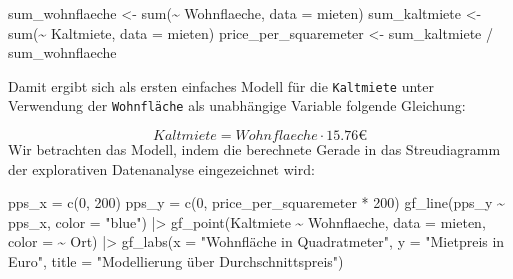 \documentclass[
  a4paper,
  DIV=11]{scrartcl}
\newenvironment{Shaded}{\begin{snugshade}}{\end{snugshade}}
\newcommand{\AttributeTok}[1]{\textcolor[rgb]{0.40,0.45,0.13}{#1}}
\newcommand{\DecValTok}[1]{\textcolor[rgb]{0.68,0.00,0.00}{#1}}
\newcommand{\FunctionTok}[1]{\textcolor[rgb]{0.28,0.35,0.67}{#1}}
\newcommand{\NormalTok}[1]{\textcolor[rgb]{0.00,0.23,0.31}{#1}}
\newcommand{\OtherTok}[1]{\textcolor[rgb]{0.00,0.23,0.31}{#1}}
\newcommand{\SpecialCharTok}[1]{\textcolor[rgb]{0.37,0.37,0.37}{#1}}
\newcommand{\StringTok}[1]{\textcolor[rgb]{0.13,0.47,0.30}{#1}}
\begin{document}
\begin{Shaded}
\begin{Highlighting}[]
\NormalTok{sum\_wohnflaeche }\OtherTok{\textless{}{-}} \FunctionTok{sum}\NormalTok{(}\SpecialCharTok{\textasciitilde{}}\NormalTok{ Wohnflaeche, }\AttributeTok{data =}\NormalTok{ mieten)}
\NormalTok{sum\_kaltmiete }\OtherTok{\textless{}{-}} \FunctionTok{sum}\NormalTok{(}\SpecialCharTok{\textasciitilde{}}\NormalTok{ Kaltmiete, }\AttributeTok{data =}\NormalTok{ mieten)}
\NormalTok{price\_per\_squaremeter }\OtherTok{\textless{}{-}}\NormalTok{ sum\_kaltmiete }\SpecialCharTok{/}\NormalTok{ sum\_wohnflaeche}
\end{Highlighting}
\end{Shaded}

Damit ergibt sich als ersten einfaches Modell für die \texttt{Kaltmiete}
unter Verwendung der \texttt{Wohnfläche} als unabhängige Variable
folgende Gleichung:

\[ Kaltmiete = Wohnflaeche \cdot 15.76 € \] Wir betrachten das Modell,
indem die berechnete Gerade in das Streudiagramm der explorativen
Datenanalyse eingezeichnet wird:

\begin{Shaded}
\begin{Highlighting}[]
\NormalTok{pps\_x }\OtherTok{=} \FunctionTok{c}\NormalTok{(}\DecValTok{0}\NormalTok{, }\DecValTok{200}\NormalTok{)}
\NormalTok{pps\_y }\OtherTok{=} \FunctionTok{c}\NormalTok{(}\DecValTok{0}\NormalTok{, price\_per\_squaremeter }\SpecialCharTok{*} \DecValTok{200}\NormalTok{)}
\FunctionTok{gf\_line}\NormalTok{(pps\_y }\SpecialCharTok{\textasciitilde{}}\NormalTok{ pps\_x, }\AttributeTok{color =} \StringTok{"blue"}\NormalTok{) }\SpecialCharTok{|\textgreater{}} 
  \FunctionTok{gf\_point}\NormalTok{(Kaltmiete }\SpecialCharTok{\textasciitilde{}}\NormalTok{ Wohnflaeche, }\AttributeTok{data =}\NormalTok{ mieten, }\AttributeTok{color =} \SpecialCharTok{\textasciitilde{}}\NormalTok{ Ort) }\SpecialCharTok{|\textgreater{}} 
  \FunctionTok{gf\_labs}\NormalTok{(}\AttributeTok{x =} \StringTok{"Wohnfläche in Quadratmeter"}\NormalTok{, }
          \AttributeTok{y =} \StringTok{"Mietpreis in Euro"}\NormalTok{, }
          \AttributeTok{title =} \StringTok{"Modellierung über Durchschnittspreis"}\NormalTok{)}
\end{Highlighting}
\end{Shaded}
\end{document}
